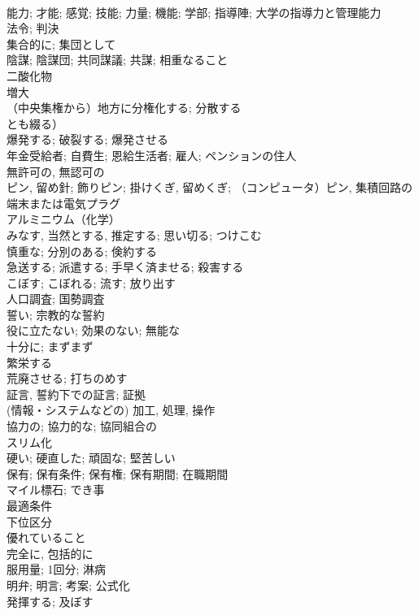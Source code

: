 \documentclass[8pt]{extreport}
\begin{document}
\begin{CJK}{UTF8}{min}
\\	能力; 才能; 感覚; 技能; 力量; 機能; 学部; 指導陣; 大学の指導力と管理能力	
\\	法令; 判決	
\\	集合的に; 集団として	
\\	陰謀; 陰謀団; 共同謀議; 共謀; 相重なること	
\\	二酸化物	
\\	増大	
\\	（中央集権から）地方に分権化する; 分散する
\\	とも綴る）	
\\	爆発する; 破裂する; 爆発させる	
\\	年金受給者; 自費生; 恩給生活者; 雇人; ペンションの住人	
\\	無許可の, 無認可の	
\\	ピン, 留め針; 飾りピン; 掛けくぎ, 留めくぎ; （コンピュータ）ピン, 集積回路の端末または電気プラグ	
\\	アルミニウム（化学）	
\\	みなす, 当然とする, 推定する; 思い切る; つけこむ	
\\	慎重な; 分別のある; 倹約する	
\\	急送する; 派遣する; 手早く済ませる; 殺害する	
\\	こぼす; こぼれる; 流す; 放り出す	
\\	人口調査; 国勢調査	
\\	誓い; 宗教的な誓約	
\\	役に立たない; 効果のない; 無能な	
\\	十分に; まずまず	
\\	繁栄する	
\\	荒廃させる; 打ちのめす	
\\	証言, 誓約下での証言; 証拠	
\\	(情報・システムなどの) 加工, 処理, 操作	
\\	協力の; 協力的な; 協同組合の	
\\	スリム化	
\\	硬い; 硬直した; 頑固な; 堅苦しい	
\\	保有; 保有条件; 保有権; 保有期間; 在職期間	
\\	マイル標石; でき事	
\\	最適条件	
\\	下位区分	
\\	優れていること	
\\	完全に, 包括的に	
\\	服用量; 1回分; 淋病	
\\	明弁; 明言; 考案; 公式化	
\\	発揮する; 及ぼす	

\end{CJK}
\end{document}
